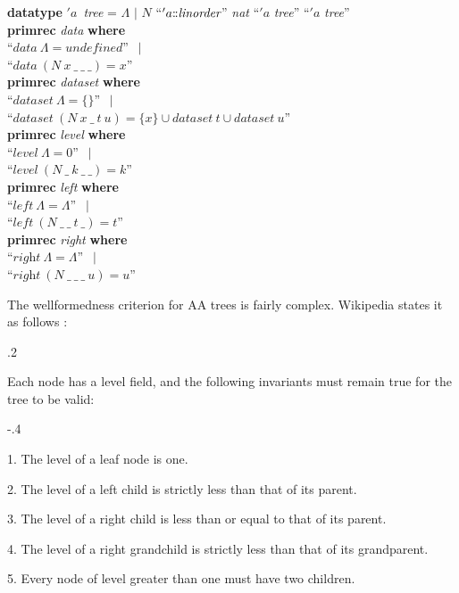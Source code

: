 \documentclass[a4paper,12pt]{article}
\def\Colon{\mathord{:\mkern-1.5mu:}}
\def\undef{\textit{undefined}}
\begin{document}
\prew
\textbf{datatype} $'a$~\textit{tree} = $\Lambda$ $\mid$ $N$ ``\kern1pt$'a\Colon \textit{linorder}$'' \textit{nat} ``\kern1pt$'a$ \textit{tree}'' ``\kern1pt$'a$ \textit{tree}''  \\[2\smallskipamount]
\textbf{primrec} \textit{data} \textbf{where} \\
``$\textit{data}~\Lambda = \undef$'' $\,\mid$ \\
``$\textit{data}~(N~x~\_~\_~\_) = x$'' \\[2\smallskipamount]
\textbf{primrec} \textit{dataset} \textbf{where} \\
``$\textit{dataset}~\Lambda = \{\}$'' $\,\mid$ \\
``$\textit{dataset}~(N~x~\_~t~u) = \{x\} \cup \textit{dataset}~t \mathrel{\cup} \textit{dataset}~u$'' \\[2\smallskipamount]
\textbf{primrec} \textit{level} \textbf{where} \\
``$\textit{level}~\Lambda = 0$'' $\,\mid$ \\
``$\textit{level}~(N~\_~k~\_~\_) = k$'' \\[2\smallskipamount]
\textbf{primrec} \textit{left} \textbf{where} \\
``$\textit{left}~\Lambda = \Lambda$'' $\,\mid$ \\
``$\textit{left}~(N~\_~\_~t~\_) = t$'' \\[2\smallskipamount]
\textbf{primrec} \textit{right} \textbf{where} \\
``$\textit{right}~\Lambda = \Lambda$'' $\,\mid$ \\
``$\textit{right}~(N~\_~\_~\_~u) = u$''
\postw

The wellformedness criterion for AA trees is fairly complex. Wikipedia states it
as follows \cite{wikipedia-2009-aa-trees}:

\kern.2\parskip %

\pre
Each node has a level field, and the following invariants must remain true for
the tree to be valid:

\raggedright

\kern-.4\parskip %

\begin{enum}
\item[]
\begin{enum}
\item[1.] The level of a leaf node is one.
\item[2.] The level of a left child is strictly less than that of its parent.
\item[3.] The level of a right child is less than or equal to that of its parent.
\item[4.] The level of a right grandchild is strictly less than that of its grandparent.
\item[5.] Every node of level greater than one must have two children.
\end{enum}
\end{enum}
\post
\end{document}
